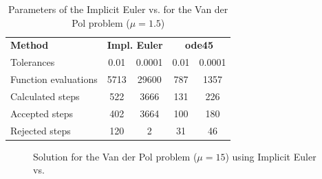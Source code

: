 \begin{table}[H]
    \centering
    \begin{tabular}{@{}l|cc|cc@{}}
    \toprule
    \textbf{Method}      & \multicolumn{2}{c|}{\textbf{Impl. Euler}} & \multicolumn{2}{c}{\textbf{ode45}} \\
    Tolerances           & 0.01               & 0.0001               & 0.01            & 0.0001           \\ \midrule
    Function evaluations & 5713               & 29600                & 787             & 1357             \\
    Calculated steps     & 522                & 3666                 & 131             & 226              \\
    Accepted steps       & 402                & 3664                 & 100             & 180              \\
    Rejected steps       & 120                & 2                    & 31              & 46               \\ \bottomrule
    \end{tabular}
    \caption{Parameters of the Implicit Euler vs.  for the Van der Pol problem ($\mathit{\mu = 1.5}$)}
    \label{3_6_adaptive_mu_1_5_table}
\end{table}

\begin{figure}[H]
    \centering
    \caption{Solution for the Van der Pol problem ($\mathit{\mu = 15}$) using Implicit Euler vs. }
    \label{3_6_mu_15}
\end{figure}

